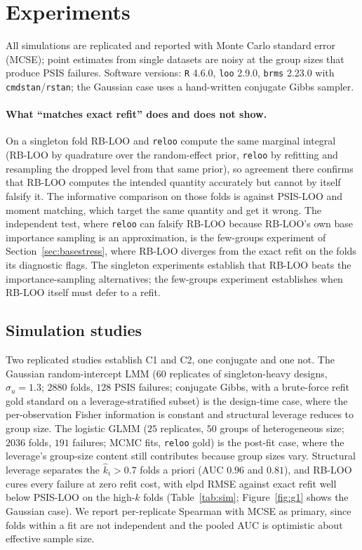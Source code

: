 \documentclass[11pt]{article}
\newcommand{\khat}{\hat{k}}
\begin{document}
\section{Experiments}\label{sec:experiments}

All simulations are replicated and reported with Monte Carlo standard error
(MCSE); point estimates from single datasets are noisy at the group sizes that
produce PSIS failures. Software versions: \texttt{R} 4.6.0, \texttt{loo} 2.9.0,
\texttt{brms} 2.23.0 with \texttt{cmdstan}/\texttt{rstan}; the Gaussian case uses
a hand-written conjugate Gibbs sampler.

\paragraph{What ``matches exact refit'' does and does not show.} On a singleton
fold RB-LOO and \texttt{reloo} compute the same marginal integral (RB-LOO by
quadrature over the random-effect prior, \texttt{reloo} by refitting and resampling
the dropped level from that same prior), so agreement there confirms that RB-LOO
computes the intended quantity accurately but cannot by itself falsify it. The
informative comparison on those folds is against PSIS-LOO and moment matching, which
target the same quantity and get it wrong. The independent test, where \texttt{reloo}
can falsify RB-LOO because RB-LOO's own base importance sampling is an approximation,
is the few-groups experiment of Section~\ref{sec:basestress}, where RB-LOO diverges
from the exact refit on the folds its diagnostic flags. The singleton experiments
establish that RB-LOO beats the importance-sampling alternatives; the few-groups
experiment establishes when RB-LOO itself must defer to a refit.

\subsection{Simulation studies}\label{sec:sim}
Two replicated studies establish C1 and C2, one conjugate and one not. The Gaussian
random-intercept LMM ($60$ replicates of singleton-heavy designs, $\sigma_u=1.3$;
$2880$ folds, $128$ PSIS failures; conjugate Gibbs, with a brute-force refit gold
standard on a leverage-stratified subset) is the design-time case, where the
per-observation Fisher information is constant and structural leverage reduces to
group size. The logistic GLMM ($25$ replicates, $50$ groups of heterogeneous size;
$2036$ folds, $191$ failures; MCMC fits, \texttt{reloo} gold) is the post-fit case,
where the leverage's group-size content still contributes because group sizes vary.
Structural leverage separates the $\khat_i>0.7$ folds a priori (AUC $0.96$ and
$0.81$), and RB-LOO cures every failure at zero refit cost, with elpd RMSE against
exact refit well below PSIS-LOO on the high-$\khat$ folds (Table~\ref{tab:sim};
Figure~\ref{fig:g1} shows the Gaussian case). We report per-replicate Spearman with
MCSE as primary, since folds within a fit are not independent and the pooled AUC is
optimistic about effective sample size.
\end{document}
